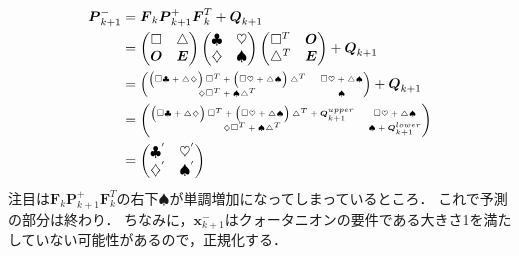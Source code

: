 \begin{align}
  \boldsymbol{P}_{k+1}^{-} &= \boldsymbol{F}_{k} \boldsymbol{P}_{k+1}^{+} \boldsymbol{F}_{k}^{T} +
  \boldsymbol{Q}_{k+1}\\
  &=
  \begin{pmatrix}
    \Box & \triangle\\
    \boldsymbol{O} & \boldsymbol{E}
  \end{pmatrix}
  \begin{pmatrix}
    \clubsuit & \heartsuit\\
    \diamondsuit & \spadesuit
  \end{pmatrix}
  \begin{pmatrix}
    \Box^{T} & \boldsymbol{O}\\
    \triangle^{T} & \boldsymbol{E}
  \end{pmatrix} +
  \boldsymbol{Q}_{k+1}\\
  &=
  {\tiny
    \begin{pmatrix}
      \left(\Box \clubsuit + \triangle \diamondsuit \right) \Box^{T} + \left(\Box \heartsuit + \triangle \spadesuit \right) \triangle^{T} & \Box \heartsuit + \triangle \spadesuit\\
      \diamondsuit \Box^{T} + \spadesuit \triangle^{T} & \spadesuit
    \end{pmatrix}
  } +
  \boldsymbol{Q}_{k+1}\\
  &=
  {\tiny
    \begin{pmatrix}
      \left(\Box \clubsuit + \triangle \diamondsuit \right) \Box^{T} + \left(\Box \heartsuit + \triangle \spadesuit \right) \triangle^{T} + \boldsymbol{Q}_{k+1}^{upper} & \Box \heartsuit + \triangle \spadesuit\\
      \diamondsuit \Box^{T} + \spadesuit \triangle^{T} & \spadesuit + \boldsymbol{Q}_{k+1}^{lower}
    \end{pmatrix}
  }\\
  &=
  \begin{pmatrix}
    \clubsuit^{'} & \heartsuit^{'}\\
    \diamondsuit^{'} & \spadesuit^{'}
  \end{pmatrix}
\end{align}
注目は$\boldsymbol{F}_{k} \boldsymbol{P}_{k+1}^{+} \boldsymbol{F}_{k}^{T}$の右下$\spadesuit$が単調増加になってしまっているところ．
これで予測の部分は終わり．
ちなみに，$\boldsymbol{x}_{k+1}^{-}$はクォータニオンの要件である大きさ1を満たしていない可能性があるので，正規化する．

